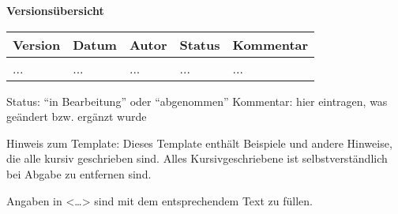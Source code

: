 



{\textbf{Versionsübersicht}}\\[2ex]

\begin{longtable}{|m{1.78cm}|m{1.59cm}|m{2.86cm}|m{1.9cm}|m{5.25cm}|}

  \hline                                              %

  \textbf{Version}  &    \textbf{Datum}  &    \textbf{Autor}  &
  \textbf{Status}   &    \textbf{Kommentar}  \\  %
  \hline                                              %

  ...    &    ...    &    ...    &    ...    &    ...\\       %
  \hline                                              %

\end{longtable}
Status: "`in Bearbeitung"' oder "`abgenommen"'
Kommentar: hier eintragen, was geändert bzw. ergänzt wurde



Hinweis zum Template:
Dieses Template enthält Beispiele und andere Hinweise, die alle kursiv
geschrieben sind. Alles Kursivgeschriebene ist selbstverständlich bei Abgabe zu
entfernen sind.

Angaben in <\ldots> sind mit dem entsprechendem Text zu füllen.

